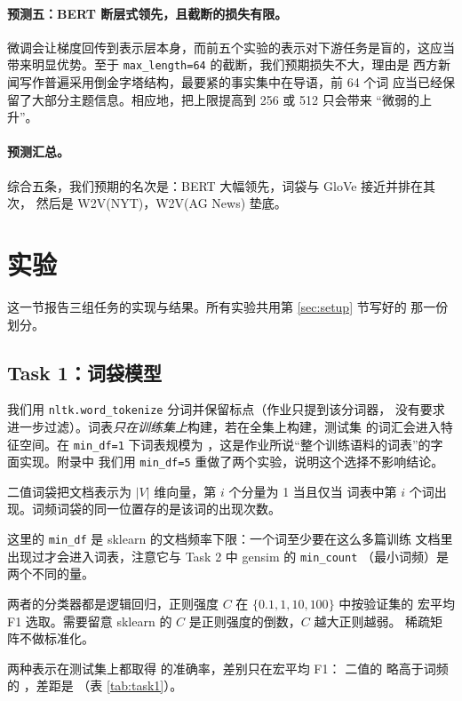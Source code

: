 \documentclass[11pt]{article}
\newcommand{\code}[1]{\texttt{\small #1}}
\begin{document}
\paragraph{预测五：BERT 断层式领先，且截断的损失有限。}
微调会让梯度回传到表示层本身，而前五个实验的表示对下游任务是盲的，这应当
带来明显优势。至于 \code{max\_length=64} 的截断，我们预期损失不大，理由是
西方新闻写作普遍采用倒金字塔结构，最要紧的事实集中在导语，前 64 个词
应当已经保留了大部分主题信息。相应地，把上限提高到 256 或 512 只会带来
``微弱的上升''。

\paragraph{预测汇总。}
综合五条，我们预期的名次是：BERT 大幅领先，词袋与 GloVe 接近并排在其次，
然后是 W2V(NYT)，W2V(AG News) 垫底。

\section{实验}\label{sec:experiments}

这一节报告三组任务的实现与结果。所有实验共用第 \ref{sec:setup} 节写好的
那一份划分。

\subsection{Task 1：词袋模型}

我们用 \code{nltk.word\_tokenize} 分词并保留标点（作业只提到该分词器，
没有要求进一步过滤）。词表\emph{只在训练集上}构建，若在全集上构建，测试集
的词汇会进入特征空间。在 \code{min\_df=1} 下词表规模为
\resultVocabSize{}，这是作业所说``整个训练语料的词表''的字面实现。附录中
我们用 \code{min\_df=5} 重做了两个实验，说明这个选择不影响结论。

二值词袋把文档表示为 $\lvert V \rvert$ 维向量，第 $i$ 个分量为 1 当且仅当
词表中第 $i$ 个词出现。词频词袋的同一位置存的是该词的出现次数。

这里的 \code{min\_df} 是 sklearn 的文档频率下限：一个词至少要在这么多篇训练
文档里出现过才会进入词表，注意它与 Task 2 中 gensim 的 \code{min\_count}
（最小词频）是两个不同的量。

两者的分类器都是逻辑回归，正则强度 $C$ 在 $\{0.1, 1, 10, 100\}$ 中按验证集的
宏平均 F1 选取。需要留意 sklearn 的 $C$ 是正则强度的倒数，$C$ 越大正则越弱。
稀疏矩阵不做标准化。

两种表示在测试集上都取得 \resultBowAcc{} 的准确率，差别只在宏平均 F1：
二值的 \resultBowFOne{} 略高于词频的 \resultBowFOneFreq{}，差距是
\resultBowPairDiff{}（表 \ref{tab:task1}）。
\end{document}
